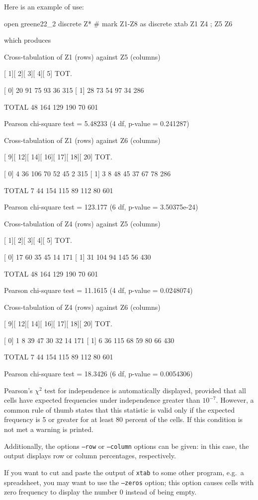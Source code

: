 Here is an example of use:
%
\begin{code}
open greene22_2
discrete Z* # mark Z1-Z8 as discrete
xtab Z1 Z4 ; Z5 Z6
\end{code}
which produces
\begin{code}
Cross-tabulation of Z1 (rows) against Z5 (columns)

       [   1][   2][   3][   4][   5]  TOT.
  
[   0]    20    91    75    93    36    315
[   1]    28    73    54    97    34    286

TOTAL     48   164   129   190    70    601

Pearson chi-square test = 5.48233 (4 df, p-value = 0.241287)

Cross-tabulation of Z1 (rows) against Z6 (columns)

       [   9][  12][  14][  16][  17][  18][  20]  TOT.
  
[   0]     4    36   106    70    52    45     2    315
[   1]     3     8    48    45    37    67    78    286

TOTAL      7    44   154   115    89   112    80    601

Pearson chi-square test = 123.177 (6 df, p-value = 3.50375e-24)

Cross-tabulation of Z4 (rows) against Z5 (columns)

       [   1][   2][   3][   4][   5]  TOT.
  
[   0]    17    60    35    45    14    171
[   1]    31   104    94   145    56    430

TOTAL     48   164   129   190    70    601

Pearson chi-square test = 11.1615 (4 df, p-value = 0.0248074)

Cross-tabulation of Z4 (rows) against Z6 (columns)

       [   9][  12][  14][  16][  17][  18][  20]  TOT.
  
[   0]     1     8    39    47    30    32    14    171
[   1]     6    36   115    68    59    80    66    430

TOTAL      7    44   154   115    89   112    80    601

Pearson chi-square test = 18.3426 (6 df, p-value = 0.0054306)
\end{code}

Pearson's $\chi^2$ test for independence is automatically displayed,
provided that all cells have expected frequencies under independence
greater than $10^{-7}$.  However, a common rule of thumb states that
this statistic is valid only if the expected frequency is 5 or
greater for at least 80 percent of the cells.  If this condition is not
met a warning is printed.

Additionally, the options \texttt{--row} or \texttt{--column} options
can be given: in this case, the output displays row or column
percentages, respectively. 

If you want to cut and paste the output of \texttt{xtab} to some other
program, e.g.\ a spreadsheet, you may want to use the \texttt{--zeros}
option; this option causes cells with zero frequency to display the
number 0 instead of being empty.

